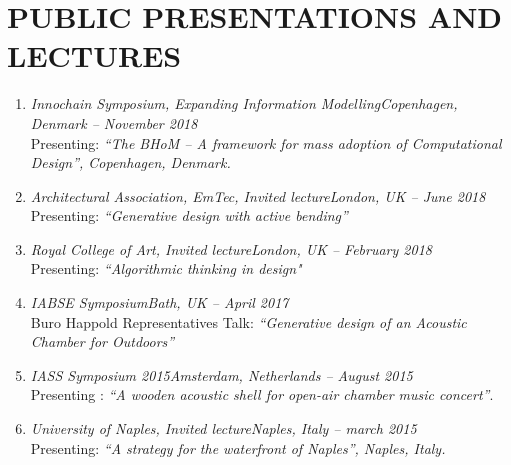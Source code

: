 \section*{PUBLIC PRESENTATIONS AND LECTURES}
    \begin{enumerate}[leftmargin=0.45cm, itemsep=0em, topsep=0.5em, parsep=0.2em]
        \item \emph{Innochain Symposium, Expanding Information Modelling}\hfill            \textit{Copenhagen, Denmark -- November 2018} \\
            Presenting: \textit{“The BHoM – A framework for mass adoption of Computational Design”, Copenhagen, Denmark.}

        \item \emph{Architectural Association, EmTec, Invited lecture}\hfill             \textit{London, UK -- June 2018} \\
            Presenting: \textit{“Generative design with active bending”}

        \item \emph{Royal College of Art, Invited lecture}\hfill \textit{London, UK -- February 2018} \\
            Presenting: \textit{“Algorithmic thinking in design"}

        \item \emph{IABSE Symposium}\hfill \textit{Bath, UK -- April 2017} \\
            Buro Happold Representatives Talk: \textit{“Generative design of an Acoustic Chamber for Outdoors”}

        \item \emph{IASS Symposium 2015}\hfill \textit{Amsterdam, Netherlands -- August 2015} \\
        Presenting : \textit{“A wooden acoustic shell for open-air chamber music concert”}.

        \item \emph{University of Naples, Invited lecture}\hfill \textit{Naples, Italy -- march 2015} \\
    	Presenting: \textit{“A strategy for the waterfront of Naples”, Naples, Italy.}

    \end{enumerate}